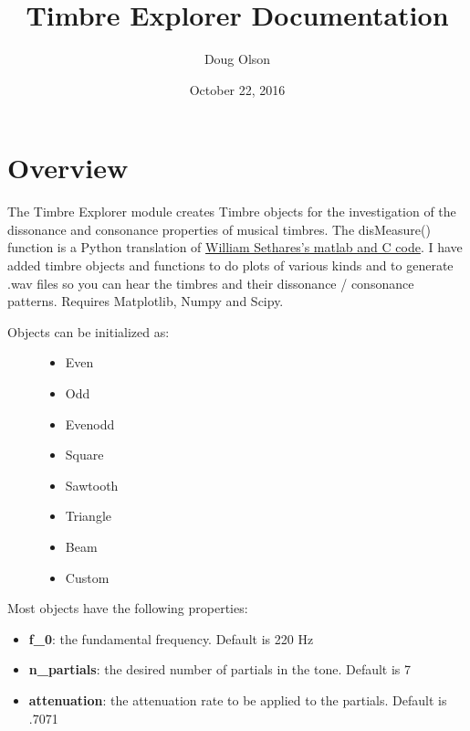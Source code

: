 \documentclass[letterpaper,10pt,english]{sphinxmanual}
\title{Timbre Explorer Documentation}
\date{October 22, 2016}
\author{Doug Olson}
\begin{document}
\maketitle
\tableofcontents
{}\label{index::doc}



\chapter{Overview}
\label{index:overview}\label{index:timbre-explorer}\label{index:module-Timbre}
The Timbre Explorer module creates Timbre objects for the investigation of the dissonance and consonance properties of musical timbres. The disMeasure() function
is a Python translation of \href{http://sethares.engr.wisc.edu/comprog.html}{William Sethares's matlab and C code}. I have added timbre objects and
functions to do plots of various kinds and to generate .wav files so you can hear the timbres and their dissonance / consonance patterns. Requires Matplotlib, Numpy and Scipy.
\begin{description}
\item[{Objects can be initialized as:}] \leavevmode\begin{itemize}
\item {} 
Even

\item {} 
Odd

\item {} 
Evenodd

\item {} 
Square

\item {} 
Sawtooth

\item {} 
Triangle

\item {} 
Beam

\item {} 
Custom

\end{itemize}

\end{description}

Most objects have the following properties:
\begin{itemize}
\item {} 
\textbf{f\_0}: the fundamental frequency. Default is 220 Hz

\item {} 
\textbf{n\_partials}: the desired number of partials in the tone. Default is 7

\item {} 
\textbf{attenuation}: the attenuation rate to be applied to the partials. Default is .7071

\end{itemize}
\end{document}
